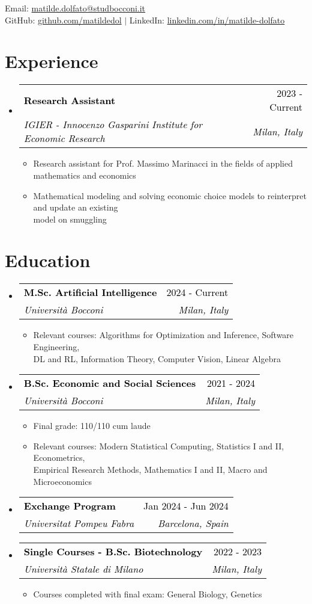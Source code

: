 \documentclass[letterpaper,11pt]{article}
\makeatletter
\newcommand{\resumeSubheading}[4]{
  \vspace{-2pt}\item
    \begin{tabular*}{1.0\textwidth}[t]{l@{\extracolsep{\fill}}r}
      \textbf{\small \textcolor{black}{#1}} & \footnotesize  \textcolor{black}{#2} \\
      \small  \textit{\textcolor{black}{#3}} & \small  \textcolor{black}{#4} \\
    \end{tabular*}\vspace{-3pt}
}
\newcommand{\resumeSubHeadingListStart}{\begin{itemize}[leftmargin=0in, label={}]}
\newcommand{\resumeSubHeadingListEnd}{\end{itemize}}
\newcommand{\resumeItemListStart}{\begin{itemize}[label=--]}
\newcommand{\resumeItemListEnd}{\end{itemize}\vspace{-5pt}}
\newcommand{\resumeItem}[1]{
  \item\small{
    {#1 \vspace{-2pt}}
  }
}
\makeatother
\begin{document}
\vspace*{-1cm}  %
\noindent
\footnotesize Email: \href{mailto:matilde.dolfato@studbocconi.it}{matilde.dolfato@studbocconi.it} \\
\footnotesize GitHub: \href{https://github.com/matildedol}{github.com/matildedol} $|$ LinkedIn: \href{https://linkedin.com/in/matilde-dolfato-556304177}{linkedin.com/in/matilde-dolfato}
\vspace{0cm}

\section{Experience}
\resumeSubHeadingListStart
\resumeSubheading
{Research Assistant}{2023 - Current}
{IGIER - Innocenzo Gasparini Institute for Economic Research}{\textit{Milan, Italy}}
\resumeItemListStart
    \resumeItem{Research assistant for Prof. Massimo Marinacci in the fields of applied mathematics and economics}
    \resumeItem{Mathematical modeling and solving economic choice models to reinterpret and update an existing\\ model on smuggling}
\resumeItemListEnd
\resumeSubHeadingListEnd
\vspace*{-.3cm}

\section{Education}
\resumeSubHeadingListStart
\vspace*{0.1cm}
\resumeSubheading
{M.Sc. Artificial Intelligence}{2024 - Current}
{Università Bocconi}{\textit{Milan, Italy}}
\resumeItemListStart
    \resumeItem{Relevant courses: Algorithms for Optimization and Inference, Software Engineering,\\ DL and RL, Information Theory, Computer Vision, Linear Algebra}
\resumeItemListEnd
\vspace*{0.2cm}

\resumeSubheading
{B.Sc. Economic and Social Sciences}{2021 - 2024}
{Università Bocconi}{\textit{Milan, Italy}}
\resumeItemListStart
    \resumeItem{Final grade: 110/110 cum laude}
    \resumeItem{Relevant courses: Modern Statistical Computing, Statistics I and II, Econometrics, \\Empirical Research Methods, Mathematics I and II, Macro and Microeconomics}
\resumeItemListEnd
\vspace*{0.2cm}
\resumeSubheading
{Exchange Program}{Jan 2024 - Jun 2024}
{Universitat Pompeu Fabra}{\textit{Barcelona, Spain}}
\vspace*{0.1cm}
\resumeSubheading
{Single Courses - B.Sc. Biotechnology}{2022 - 2023}
{Università Statale di Milano}{\textit{Milan, Italy}}
\resumeItemListStart
\resumeItem\small{Courses completed with final exam: General Biology, Genetics}
\resumeItemListEnd
\resumeSubHeadingListEnd
\vspace*{-0.3cm}
\end{document}
